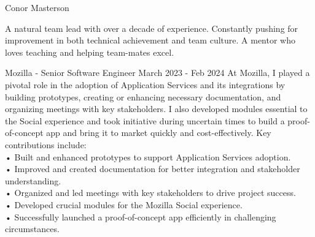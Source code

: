 \documentclass[
	10pt, %
]{FreemanCV}
\begin{document}
	
{\sffamily\Huge\noindent Conor Masterson} %
	
\medskip %
	
{\sffamily\large\noindent A natural team lead with over a decade of experience. Constantly pushing for improvement in both technical achievement and team culture. A mentor who loves teaching and helping team-mates excel.}
\medskip

\begin{paracol}{2} %


\jobentry
	{Mozilla - Senior Software Engineer}
    {March 2023 - Feb 2024}
    {At Mozilla, I played a pivotal role in the adoption of Application Services and its integrations by building prototypes, creating or enhancing necessary documentation, and organizing meetings with key stakeholders. I also developed modules essential to the Social experience and took initiative during uncertain times to build a proof-of-concept app and bring it to market quickly and cost-effectively. Key contributions include:\medskip\\
    • Built and enhanced prototypes to support Application Services adoption.\\
    • Improved and created documentation for better integration and stakeholder understanding.\\
    • Organized and led meetings with key stakeholders to drive project success.\\
    • Developed crucial modules for the Mozilla Social experience.\\
    • Successfully launched a proof-of-concept app efficiently in challenging circumstances.}


\end{paracol}
\end{document}
